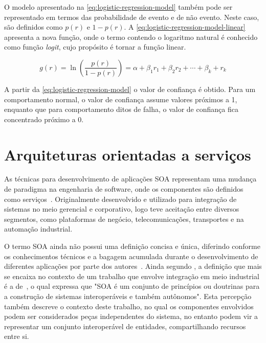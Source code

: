 O modelo apresentado na \cref{eq:logistic-regression-model} também pode ser representado em termos
das probabilidade de evento e de não evento. Neste caso, são definidos como $p(r)$ e $1 - p(r)$. A
\cref{eq:logistic-regression-model-linear} apresenta a nova função, onde o termo contendo o
logaritmo natural é conhecido como função \emph{logit}, cujo propósito é tornar a função linear.

\begin{equation}
  g(r) =
  \ln \left ( \frac{p(r)}{1 - p(r)} \right ) =
  \alpha + \beta_{1} r_{1} + \beta_{2} r_{2} + \cdots + \beta_{k} + r_{k}
  \label{eq:logistic-regression-model-linear}
\end{equation}

A partir da \cref{eq:logistic-regression-model} o valor de confiança é obtido. Para um comportamento
normal, o valor de confiança assume valores próximos a \num{1}, enquanto que para comportamento
ditos de falha, o valor de confiança fica concentrado próximo a \num{0}.


\section{Arquiteturas orientadas a serviços}
\label{sec:arquiteturas-orientadas-servicos}

As técnicas para desenvolvimento de aplicações \gls{SOA} representam uma mudança de paradigma na
engenharia de software, onde os componentes são definidos como serviços~\cite{ramollari2007survey}.
Originalmente desenvolvido e utilizado para integração de sistemas no meio gerencial e corporativo,
logo teve aceitação entre diversos segmentos, como plataformas de negócio, telecomunicações,
transportes e na automação industrial.

O termo \gls{SOA} ainda não possui uma definição concisa e única, diferindo conforme os
conhecimentos técnicos e a bagagem acumulada durante o desenvolvimento de diferentes aplicações por
parte dos autores~\cite{candido2013soa}. Ainda segundo \cite{candido2013soa}, a definição que mais
se encaixa no contexto de um trabalho que envolve integração em meio industrial é a
de~\cite{jammes2005service}, o qual expressa que "\gls{SOA} é um conjunto de princípios ou doutrinas
para a construção de sistemas interoperáveis e também autônomos". Esta percepção também descreve o
contexto deste trabalho, no qual os componentes envolvidos podem ser considerados peças
independentes do sistema, no entanto podem vir a representar um conjunto interoperável de entidades,
compartilhando recursos entre si.

